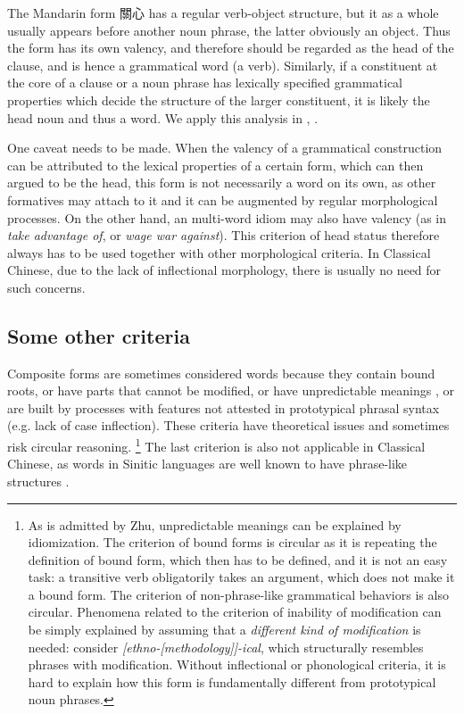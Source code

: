 \documentclass[UTF8, a4paper, oneside, scheme=plain, 12pt]{ctexrep}
\newcommand*{\citepage}[1]{p.~{#1}}
\newcommand*{\citepages}[1]{pp.~{#1}}
\newcommand{\form}[1]{\emph{#1}}
\begin{document}
The Mandarin form 關心 has a regular verb-object structure, but it as a whole usually appears before another noun phrase, the latter obviously an object.
Thus the form has its own valency, and therefore should be regarded as the head of the clause, and is hence a grammatical word (a verb).
Similarly, if a constituent at the core of a clause or a noun phrase has lexically specified grammatical properties which decide the structure of the larger constituent, it is likely the head noun and thus a word. 
We apply this analysis in , .

One caveat needs to be made.
When the valency of a grammatical construction can be attributed to the lexical properties of a certain form, which can then argued to be the head,
this form is not necessarily a word on its own, as other formatives may attach to it and it can be augmented by regular morphological processes.
On the other hand, an multi-word idiom may also have valency (as in \form{take advantage of}, or \form{wage war against}).
This criterion of head status therefore always has to be used together with other morphological criteria.
In Classical Chinese, due to the lack of inflectional morphology, there is usually no need for such concerns.

\subsection{Some other criteria}\label{sec:grammatical.morphology.unreliable}

Composite forms are sometimes considered words because they contain bound roots,
or have parts that cannot be modified, or have unpredictable meanings \citep[\citepages{41-43}]{zhudexigrammar},
or are built by processes with features not attested in prototypical phrasal syntax (e.g. lack of case inflection).
These criteria have theoretical issues and sometimes risk circular reasoning.%
\footnote{
    As is admitted by Zhu, unpredictable meanings can be explained by idiomization.
    The criterion of bound forms is circular as it is repeating the definition of bound form,
    which then has to be defined, and it is not an easy task:
    a transitive verb obligatorily takes an argument, which does not make it a bound form.
    The criterion of non-phrase-like grammatical behaviors is also circular. 
    Phenomena related to the criterion of inability of modification can be simply explained by assuming that a \emph{different kind of modification} is needed:
    consider \form{[ethno-[methodology]]-ical}, which structurally resembles phrases with modification.
    Without inflectional or phonological criteria,
    it is hard to explain how this form is fundamentally different from prototypical noun phrases.
}
The last criterion is also not applicable in Classical Chinese,
as words in Sinitic languages are well known to have phrase-like structures
\citep[\citepage{41}]{zhudexigrammar}.
\end{document}
